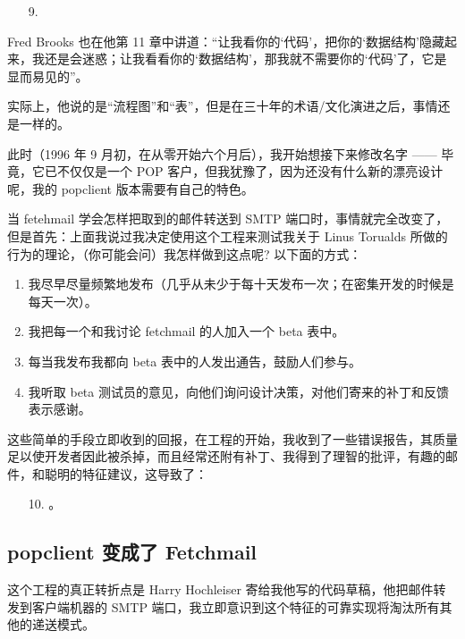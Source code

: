 \begin{enumerate}
\item[9.] 
\end{enumerate}

Fred Brooks 也在他第 11 章中讲道：“让我看你的‘代码’，把你的‘数据结构’隐藏起来，我还是会迷惑；让我看看你的‘数据结构’，那我就不需要你的‘代码’了，它是显而易见的”。


实际上，他说的是“流程图”和“表”，但是在三十年的术语/文化演进之后，事情还是一样的。


此时（1996 年 9 月初，在从零开始六个月后），我开始想接下来修改名字 —— 毕竟，它已不仅仅是一个 POP 客户，但我犹豫了，因为还没有什么新的漂亮设计呢，我的 popclient 版本需要有自己的特色。

当 fetehmail 学会怎样把取到的邮件转送到 SMTP 端口时，事情就完全改变了，但是首先：上面我说过我决定使用这个工程来测试我关于 Linus Torualds 所做的行为的理论，（你可能会问）我怎样做到这点呢? 以下面的方式：

\begin{enumerate}
\item 我尽早尽量频繁地发布（几乎从未少于每十天发布一次；在密集开发的时候是每天一次）。
\item 我把每一个和我讨论 fetchmail 的人加入一个 beta 表中。
\item 每当我发布我都向 beta 表中的人发出通告，鼓励人们参与。
\item 我听取 beta 测试员的意见，向他们询问设计决策，对他们寄来的补丁和反馈表示感谢。
\end{enumerate}

这些简单的手段立即收到的回报，在工程的开始，我收到了一些错误报告，其质量足以使开发者因此被杀掉，而且经常还附有补丁、我得到了理智的批评，有趣的邮件，和聪明的特征建议，这导致了：

\begin{enumerate}
\item[10.] 。
\end{enumerate}

\subsection{popclient 变成了 Fetchmail}


这个工程的真正转折点是 Harry Hochleiser 寄给我他写的代码草稿，他把邮件转发到客户端机器的 SMTP 端口，我立即意识到这个特征的可靠实现将淘汰所有其他的递送模式。


